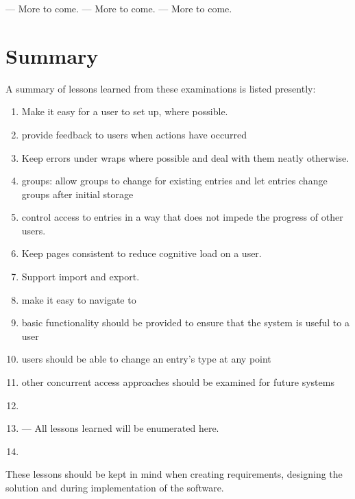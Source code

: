 \revisit{} --- More to come.
\revisit{} --- More to come.
\revisit{} --- More to come.


\section{Summary}
A summary of lessons learned from these examinations is listed presently:
\begin{enumerate}
	\item Make it easy for a user to set up, where possible.
	\item provide feedback to users when actions have occurred 
	\item Keep errors under wraps where possible and deal with them neatly otherwise.
	\item groups: allow groups to change for existing entries and let entries change groups after initial storage
	\item control access to entries in a way that does not impede the progress of other users.
	\item Keep pages consistent to reduce cognitive load on a user.
	\item Support \bibtex{} import and export.
	\item make it easy to navigate to
	\item basic functionality should be provided to ensure that the system is useful to a user
	\item users should be able to change an entry's type at any point
	\item other concurrent access approaches should be examined for future systems
	\item 
	\item \revisit --- All lessons learned will be enumerated here.
	\item 
\end{enumerate}

These lessons should be kept in mind when creating requirements, designing the solution and during implementation of the software.